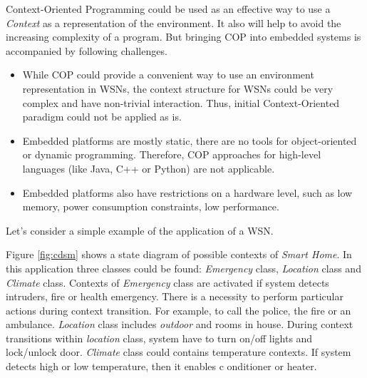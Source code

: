 \documentclass{ubicomp-ext}
\begin{document}
Context-Oriented Programming could be used as an effective way to use a \textit{Context} as a representation of the environment. It also will help to avoid the increasing complexity of a program. But bringing COP into embedded systems is accompanied by following challenges.

\begin{itemize}\compresslist
\item
While COP could provide a convenient way to use an environment representation in WSNs, the context structure for WSNs could be very complex and have non-trivial interaction. Thus, initial Context-Oriented paradigm could not be applied as is.
\item
Embedded platforms are mostly static, there are no tools for object-oriented or dynamic programming. Therefore, COP approaches for high-level languages (like Java, C++ or Python) are not applicable. 
\item
Embedded platforms also have restrictions on a hardware level, such as low memory, power consumption constraints, low performance.
\end{itemize}

Let's consider a simple example of the application of a WSN. 

Figure \ref{fig:cdsm} shows a state diagram of possible contexts of \textit{Smart Home}. In this application three classes could be found: \textit{Emergency} class, \textit{Location} class and \textit{Climate} class. Contexts of \textit{Emergency} class are activated if system detects intruders, fire or health emergency. There is a necessity to perform particular actions during context transition. For example, to call the police, the fire or an ambulance. \textit{Location} class includes \textit{outdoor} and rooms in house. During context transitions within \textit{location} class, system have to turn on/off lights and lock/unlock door. \textit{Climate} class could contains temperature contexts. If system detects high or low temperature, then it enables c
onditioner or heater.
\end{document}
